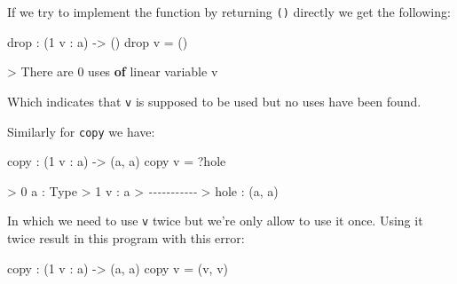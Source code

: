 \documentclass[
]{article}
\newenvironment{Shaded}{}{}
\newcommand{\CommentTok}[1]{\textcolor[rgb]{0.38,0.63,0.69}{\textit{#1}}}
\newcommand{\DataTypeTok}[1]{\textcolor[rgb]{0.56,0.13,0.00}{#1}}
\newcommand{\DecValTok}[1]{\textcolor[rgb]{0.25,0.63,0.44}{#1}}
\newcommand{\FunctionTok}[1]{\textcolor[rgb]{0.02,0.16,0.49}{#1}}
\newcommand{\KeywordTok}[1]{\textcolor[rgb]{0.00,0.44,0.13}{\textbf{#1}}}
\newcommand{\NormalTok}[1]{#1}
\newcommand{\OperatorTok}[1]{\textcolor[rgb]{0.40,0.40,0.40}{#1}}
\newcommand{\OtherTok}[1]{\textcolor[rgb]{0.00,0.44,0.13}{#1}}
\begin{document}
If we try to implement the function by returning \texttt{()} directly we
get the following:

\begin{Shaded}
\begin{Highlighting}[]
\FunctionTok{drop} \OperatorTok{:}\NormalTok{ (}\DecValTok{1}\NormalTok{ v }\OperatorTok{:}\NormalTok{ a) }\OtherTok{{-}\textgreater{}}\NormalTok{ ()}
\FunctionTok{drop}\NormalTok{ v }\OtherTok{=}\NormalTok{ ()}
\end{Highlighting}
\end{Shaded}

\begin{Shaded}
\begin{Highlighting}[]
\OperatorTok{\textgreater{}} \DataTypeTok{There}\NormalTok{ are }\DecValTok{0}\NormalTok{ uses }\KeywordTok{of}\NormalTok{ linear variable v}
\end{Highlighting}
\end{Shaded}

Which indicates that \texttt{v} is supposed to be used but no uses have
been found.

Similarly for \texttt{copy} we have:

\begin{Shaded}
\begin{Highlighting}[]
\NormalTok{copy }\OperatorTok{:}\NormalTok{ (}\DecValTok{1}\NormalTok{ v }\OperatorTok{:}\NormalTok{ a) }\OtherTok{{-}\textgreater{}}\NormalTok{ (a, a)}
\NormalTok{copy v }\OtherTok{=} \OperatorTok{?}\NormalTok{hole}
\end{Highlighting}
\end{Shaded}

\begin{Shaded}
\begin{Highlighting}[]
\OperatorTok{\textgreater{}} \DecValTok{0}\NormalTok{ a }\OperatorTok{:} \DataTypeTok{Type}
\OperatorTok{\textgreater{}} \DecValTok{1}\NormalTok{ v }\OperatorTok{:}\NormalTok{ a}
\OperatorTok{\textgreater{}} \CommentTok{{-}{-}{-}{-}{-}{-}{-}{-}{-}{-}{-}}
\OperatorTok{\textgreater{}}\NormalTok{ hole }\OperatorTok{:}\NormalTok{ (a, a)}
\end{Highlighting}
\end{Shaded}

In which we need to use \texttt{v} twice but we're only allow to use it
once. Using it twice result in this program with this error:

\begin{Shaded}
\begin{Highlighting}[]
\NormalTok{copy }\OperatorTok{:}\NormalTok{ (}\DecValTok{1}\NormalTok{ v }\OperatorTok{:}\NormalTok{ a) }\OtherTok{{-}\textgreater{}}\NormalTok{ (a, a)}
\NormalTok{copy v }\OtherTok{=}\NormalTok{ (v, v)}
\end{Highlighting}
\end{Shaded}
\end{document}
